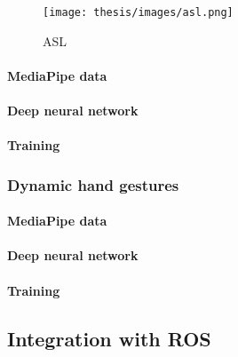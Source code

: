 \documentclass[../thesis.tex]{subfiles}
\begin{document}
\begin{figure}[H]
    \centering
    \texttt{[image: thesis/images/asl.png]}
    \caption{\glsdesc{ASL}~\parencite{img:asl}}\label{fig:asl}
\end{figure}

\paragraph{MediaPipe data}

\paragraph{Deep neural network}

\paragraph{Training}

\subsubsection{Dynamic hand gestures}

\paragraph{MediaPipe data}

\paragraph{Deep neural network}

\paragraph{Training}

\subsection{Integration with ROS}
\end{document}
